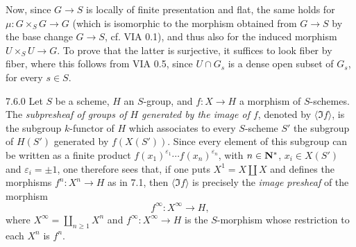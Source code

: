 Now, since $G\to S$ is locally of finite presentation and flat, the same holds for $\mu:G\times_S G\to G$ (which is isomorphic to the morphism obtained from $G\to S$ by the base change $G\to S$, cf. VIA 0.1), and thus also for the induced morphism $U\times_S U\to G$. To prove that the latter is surjective, it suffices to look fiber by fiber, where this follows from VIA 0.5, since $U\cap G_s$ is a dense open subset of $G_s$, for every $s\in S$.

\begin{remark}{7.6.0}\label{VIB.7.6.0}
Let $S$ be a scheme, $H$ an $S$-group, and $f:X\to H$ a morphism of $S$-schemes. The \emph{subpresheaf of groups of $H$ generated by the image of $f$}, denoted by $\langle\Im f\rangle$, is the subgroup $k$-functor of $H$ which associates to every $S$-scheme $S'$ the subgroup of $H(S')$ generated by $f(X(S'))$. Since every element of this subgroup can be written as a finite product $f(x_1)^{\varepsilon_1}\cdots f(x_n)^{\varepsilon_n}$, with $n\in\mathbf{N}^*$, $x_i\in X(S')$ and $\varepsilon_i=\pm1$, one therefore sees that, if one puts $X^1=X\coprod X$ and defines the morphisms $f^n:X^n\to H$ as in 7.1, then $\langle\Im f\rangle$ is precisely the \emph{image presheaf} of the morphism
\[
f^\infty:X^\infty\to H,
\]
where $X^\infty=\coprod_{n\geq1}X^n$ and $f^\infty:X^\infty\to H$ is the $S$-morphism whose restriction to each $X^n$ is $f^n$.
\end{remark}


